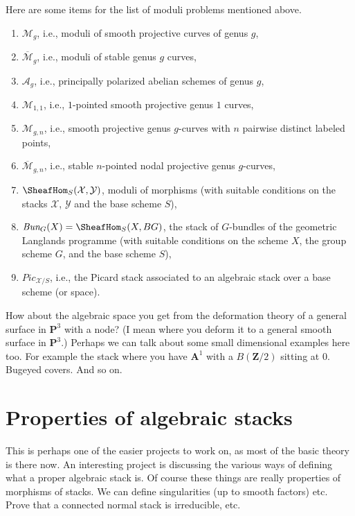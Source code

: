 \medskip\noindent
Here are some items for the list of moduli problems mentioned above.
\begin{enumerate}
\item $\mathcal{M}_g$, i.e., moduli of smooth projective curves of genus $g$,
\item $\overline{\mathcal{M}}_g$, i.e., moduli of stable genus $g$ curves,
\item $\mathcal{A}_g$,
i.e., principally polarized abelian schemes of genus $g$,
\item $\mathcal{M}_{1, 1}$, i.e.,
$1$-pointed smooth projective genus $1$ curves,
\item $\mathcal{M}_{g, n}$, i.e., smooth projective genus $g$-curves
with $n$ pairwise distinct labeled points,
\item $\overline{\mathcal{M}}_{g, n}$, i.e.,
stable $n$-pointed nodal projective genus $g$-curves,
\item $\SheafHom_S(\mathcal{X}, \mathcal{Y})$, moduli of morphisms
(with suitable conditions on the stacks $\mathcal{X}$, $\mathcal{Y}$
and the base scheme $S$),
\item $\textit{Bun}_G(X) = \SheafHom_S(X, BG)$, the stack of $G$-bundles
of the geometric Langlands programme (with suitable conditions on the scheme
$X$, the group scheme $G$, and the base scheme $S$),
\item $\textit{Pic}_{\mathcal{X}/S}$, i.e., the Picard stack associated
to an algebraic stack over a base scheme (or space).
\end{enumerate}

\medskip\noindent
How about the algebraic space you get from the deformation theory of
a general surface in $\mathbf{P}^3$ with a node? (I mean where you deform
it to a general smooth surface in $\mathbf{P}^3$.)
Perhaps we can talk about some small dimensional examples here too.
For example the stack where you have $\mathbf{A}^1$ with a $B(\mathbf{Z}/2)$
sitting at $0$. Bugeyed covers. And so on.


\section{Properties of algebraic stacks}
\label{section-stacks-properties}

\noindent
This is perhaps one of the easier projects to work on, as most of the
basic theory is there now. An interesting project is discussing the
various ways of defining what a proper algebraic stack is.
Of course these things are really properties of morphisms of stacks.
We can define singularities (up to smooth factors) etc. Prove that a
connected normal stack is irreducible, etc.


